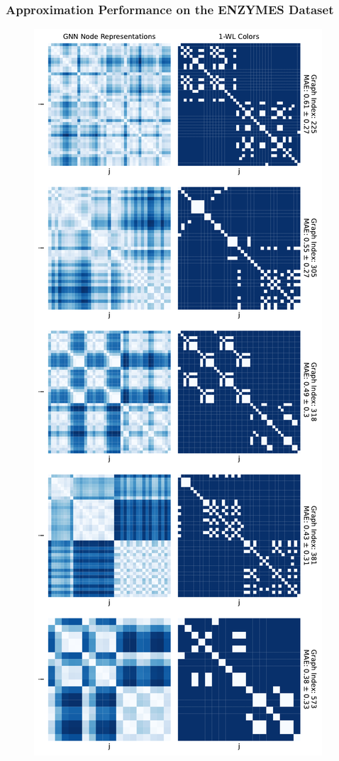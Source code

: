 \subsubsection{Approximation Performance on the ENZYMES Dataset}
\begin{figure}[H]
    \centering
    \begin{minipage}[b]{0.45992852703\textwidth}
        \centering
        \includegraphics[width=\textwidth, left]{Figures/heatmaps_ENZYMES_0.pdf}

\end{minipage}
\end{figure}
